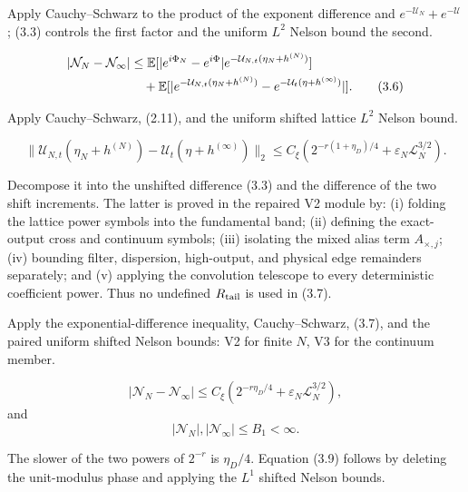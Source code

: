 \documentclass[11pt,a4paper]{article}
\newcommand{\eps}{\varepsilon}
\newcommand{\U}{\mathcal U}
\newcommand{\logN}{\mathcal L_N}
\begin{document}
\Because Apply Cauchy--Schwarz to the product of the exponent difference and
$e^{-\U_N}+e^{-\U}$; (3.3) controls the first factor and the uniform $L^2$
Nelson bound the second.

\QedStep


\begin{align}
 |\mathcal N_N-\mathcal N_\infty|
 &\le\E[|e^{i\Phi_N}-e^{i\Phi}|
 e^{-\U_{N,t}(\eta_N+h^{(N)})}]\notag\\
 &\quad+\E[|e^{-\U_{N,t}(\eta_N+h^{(N)})}
 -e^{-\U_t(\eta+h^{(\infty)})}|].
\tag{3.6}
\end{align}


\Because Apply Cauchy--Schwarz, (2.11), and the uniform shifted lattice
$L^2$ Nelson bound.

\[
 \|\U_{N,t}(\eta_N+h^{(N)})-
 \U_t(\eta+h^{(\infty)})\|_2
 \le C_\xi\left(2^{-r(1+\eta_D)/4}
 +\eps_N\logN^{3/2}\right).
\tag{3.7}
\]

\Because Decompose it into the unshifted difference (3.3) and the difference of
the two shift increments.  The latter is proved in the repaired V2 module by:
(i) folding the lattice power symbols into the fundamental band; (ii) defining the
exact-output cross and continuum symbols; (iii) isolating the mixed alias term
$A_{\times,j}$; (iv) bounding filter, dispersion, high-output, and physical edge
remainders separately; and (v) applying the convolution telescope to every
deterministic coefficient power.  Thus no undefined $R_{\rm tail}$ is used in
(3.7).


\Because Apply the exponential-difference inequality, Cauchy--Schwarz, (3.7),
and the paired uniform shifted Nelson bounds: V2 for finite $N$, V3 for the
continuum member.

\[
 |\mathcal N_N-\mathcal N_\infty|
 \le C_\xi(2^{-r\eta_D/4}+\eps_N\logN^{3/2}),
\tag{3.8}
\]
and
\[
 |\mathcal N_N|,|\mathcal N_\infty|\le B_1<\infty.
\tag{3.9}
\]

\Because The slower of the two powers of $2^{-r}$ is $\eta_D/4$.  Equation
(3.9) follows by deleting the unit-modulus phase and applying the $L^1$ shifted
Nelson bounds.
\end{document}

